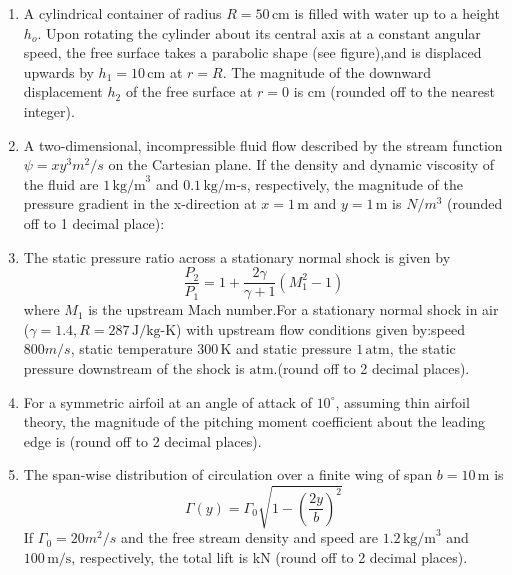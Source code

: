 \documentclass[journal,12pt,onecolumn]{IEEEtran}
\theoremstyle{remark}
\begin{document}
\begin{enumerate}
    \item A cylindrical container of radius $R = 50 \, \text{cm}$ is filled with water up to a height $h_o$. Upon rotating the cylinder about its central axis at a constant angular speed, the free surface takes a parabolic shape (see figure),and is displaced upwards by $h_1 = 10 \, \text{cm}$ at $r = R$. The magnitude of the downward displacement $h_2$ of the free surface at $r = 0$ is {\underline{\hspace{1cm}}} cm (rounded off to the nearest integer).
  \begin{figure}[H]
        \centering
          
    \end{figure}
    \item A two-dimensional, incompressible fluid flow described by the stream function $\psi = xy^3 m^2/s $ on the Cartesian plane. If the density and dynamic viscosity of the fluid are $1 \, \text{kg/m}^3$ and $0.1 \, \text{kg/m-s}$, respectively, the magnitude of the pressure gradient in the x-direction at $x = 1 \, \text{m}$ and $y = 1 \, \text{m}$ is {\underline{\hspace{1cm}}} $N/m^3$ (rounded off to 1 decimal place):
    
    \item The static pressure ratio across a stationary normal shock is given by 
    \[
\frac{P_2}{P_1} = 1+\frac {2\gamma}{\gamma+1}(M_1^2-1)
\]
    where $M_1$ is the upstream Mach number.For a stationary normal shock in air ($\gamma = 1.4, R = 287 \, \text{J/kg-K}$) with upstream flow conditions given by:speed $800m/s$, static  temperature $ 300 \, \text{K}$ and static pressure $1 \, \text{atm}$, the static pressure downstream of the shock is {\underline{\hspace{1cm}}} $\text{atm}$.(round off to 2 decimal places).
    
    \item For a symmetric airfoil at an angle of attack of $10^\circ$, assuming thin airfoil theory, the magnitude of the pitching moment coefficient about the leading edge is {\underline{\hspace{1cm}}}(round off to 2 decimal places).
    
    \item The span-wise distribution of circulation over a finite wing of span $b = 10 \, \text{m}$ is 
    \[
    \Gamma(y) = \Gamma_0 \sqrt{1 - (\frac{2y}{b})^2}
    \]
    If $\Gamma_0 = 20m^2/s$ and the free stream density and speed are $1.2 \, \text{kg/m}^3$ and $100 \, \text{m/s}$, respectively, the total lift is {\underline{\hspace{1cm}}} kN (round off to 2 decimal places).
\end{enumerate}
\end{document}
